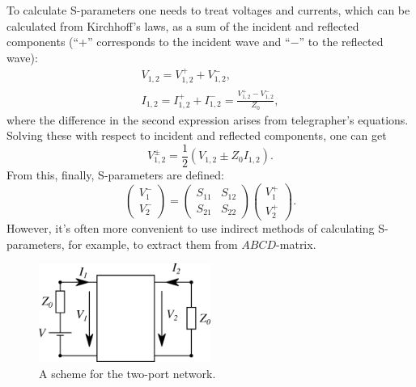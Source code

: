 \documentclass[12pt]{report}
\newcommand{\rbrkt}[1]{\left( #1 \right)}
\numberwithin{equation}{section}
\begin{document}
To calculate S-parameters one needs to treat voltages and currents, which can be calculated from Kirchhoff's laws, as a sum of the incident and reflected components (``+'' corresponds to the incident wave and ``$-$'' to the reflected wave):
\begin{gather*}
V_{1,2} = V_{1,2}^+ + V_{1,2}^- ,\\
I_{1,2} = I_{1,2}^+ + I_{1,2}^- = \frac{ V_{1,2}^+ - V_{1,2}^- }{Z_0},
\end{gather*}
where the difference in the second expression arises from telegrapher's equations. Solving these with respect to incident and reflected components, one can get
\begin{equation*}
V_{1,2}^\pm = \frac{1}{2}(V_{1,2} \pm Z_0 I_{1,2}).
\end{equation*}
From this, finally, S-parameters are defined:
\begin{equation}
\rbrkt{\begin{matrix}
V_1^- \\
V_2^-
\end{matrix}} = 
\rbrkt{\begin{matrix}
S_{11} & S_{12} \\
S_{21} & S_{22}
\end{matrix}}
\rbrkt{\begin{matrix}
V_1^+ \\
V_2^+
\end{matrix}}.
\label{eq:S_def}
\end{equation}
However, it's often more convenient to use indirect methods of calculating S-parameters, for example, to extract them from $ABCD$-matrix.

\begin{figure}
\centering
\includegraphics[width=0.5\textwidth]{tl_scheme_general}
\caption{A scheme for the two-port network.}
\label{fgeneral2port}
\end{figure}
\end{document}
